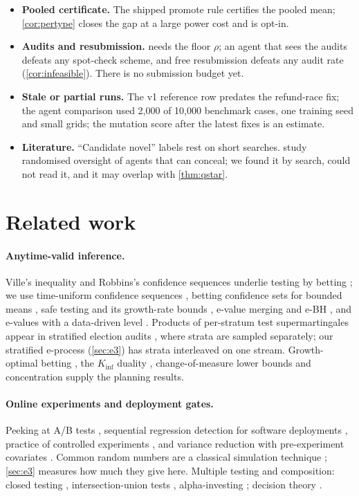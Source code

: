 \documentclass[11pt]{article}
\theoremstyle{definition}
\theoremstyle{remark}
\newcommand{\1}{\mathbf{1}}
\newcommand{\Kinf}{K_{\inf}}
\begin{document}
\begin{itemize}
\item \textbf{Pooled certificate.} The shipped promote rule certifies the pooled mean; \cref{cor:pertype} closes the gap at a large power cost and is opt-in.
\item \textbf{Audits and resubmission.}  needs the floor $\rho$; an agent that sees the audits defeats any spot-check scheme, and free resubmission defeats any audit rate (\cref{cor:infeasible}). There is no submission budget yet.
\item \textbf{Stale or partial runs.} The v1 reference row predates the refund-race fix; the agent comparison used 2{,}000 of 10{,}000 benchmark cases, one training seed and small grids; the mutation score after the latest fixes is an estimate.
\item \textbf{Literature.} ``Candidate novel'' labels rest on short searches. \citet{gans2026} study randomised oversight of agents that can conceal; we found it by search, could not read it, and it may overlap with \cref{thm:qstar}.
\end{itemize}

\section{Related work}\label{sec:related}

\paragraph{Anytime-valid inference.} Ville's inequality \citep{ville1939} and Robbins's confidence sequences \citep{robbins1970} underlie testing by betting \citep{shafer2019,ramdas2023}; we use time-uniform confidence sequences \citep{howard2021}, betting confidence sets for bounded means \citep{waudbysmith2023}, safe testing and its growth-rate bounds \citep{grunwald2024safe}, e-value merging and e-BH \citep{vovkwang2021,wangramdas2022}, and e-values with a data-driven level \citep{grunwald2024pnas}. Products of per-stratum test supermartingales appear in stratified election audits \citep{spertus2022}, where strata are sampled separately; our stratified e-process (\cref{sec:e3}) has strata interleaved on one stream. Growth-optimal betting \citep{kelly1956}, the $\Kinf$ duality \citep{honda2010}, change-of-measure lower bounds \citep{kaufmann2016} and concentration \citep{hoeffding1963,boucheron2013} supply the planning results.

\paragraph{Online experiments and deployment gates.} Peeking at A/B tests \citep{johari2017}, sequential regression detection for software deployments \citep{lindon2022}, practice of controlled experiments \citep{kohavi2020}, and variance reduction with pre-experiment covariates \citep{deng2013}. Common random numbers are a classical simulation technique \citep{glasserman1992,asmussen2007}; \cref{sec:e3} measures how much they give here. Multiple testing and composition: closed testing \citep{marcus1976}, intersection-union tests \citep{berger1982}, alpha-investing \citep{foster2008}; decision theory \citep{berger1985,hodges1952}.
\end{document}
